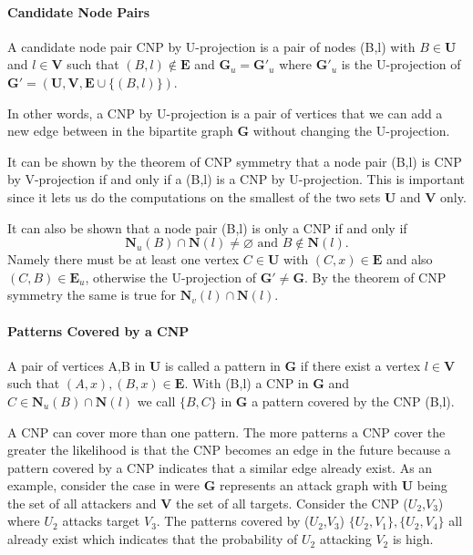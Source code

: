 \paragraph{Candidate Node Pairs}
A candidate node pair CNP by U-projection is a pair of nodes (B,l) with $B\in\textbf{U}$ and $l\in\textbf{V}$ such that $(B,l)\notin\textbf{E}$ and $\textbf{G}_u=\textbf{G}'_u$ where $\textbf{G}'_u$ is the U-projection of $\textbf{G}'=(\textbf{U},\textbf{V},\textbf{E}\cup\{(B,l)\})$.

In other words, a CNP by U-projection is a pair of vertices that we can add a new edge between in the bipartite graph $\textbf{G}$ without changing the U-projection.

It can be shown\cite{plp} by the theorem of CNP symmetry that  a node pair (B,l) is CNP by V-projection if and only if a (B,l) is a CNP by U-projection. This is important since it lets us do the computations on the smallest of the two sets $\textbf{U}$ and $\textbf{V}$ only.

It can also be shown\cite{plp} that a node pair (B,l) is only a CNP if and only if 
$$
\textbf{N}_u(B)\cap\textbf{N}(l) \neq \varnothing\text{ and } B\notin \textbf{N}(l).
$$
Namely there must be at least one vertex $C\in\textbf{U}$ with $(C,x)\in\textbf{E}$ and also $(C,B)\in\textbf{E}_u$, otherwise the U-projection of $\textbf{G}'\neq\textbf{G}$. By the theorem of CNP symmetry the same is true for $\textbf{N}_v(l)\cap\textbf{N}(l)$.

\paragraph{Patterns Covered by a CNP}
A pair of vertices {A,B} in $\textbf{U}$ is called a pattern in $\textbf{G}$ if there exist a vertex $l\in\textbf{V}$ such that $(A,x),(B,x)\in\textbf{E}$. With (B,l) a CNP in $\textbf{G}$ and  $C\in\textbf{N}_u(B)\cap\textbf{N}(l)$ we call $\{B,C\}$ in $\textbf{G}$ a pattern covered by the CNP (B,l).

A CNP can cover more than one pattern. The more patterns a CNP cover the greater the likelihood is that the CNP becomes an edge in the future because a pattern covered by a CNP indicates that a similar edge already exist. As an example, consider the case in  were $\textbf{G}$ represents an attack graph with $\textbf{U}$ being the set of all attackers and $\textbf{V}$ the set of all targets. Consider the CNP ($U_2$,$V_3$) where $U_2$ attacks target $V_3$. The patterns covered by ($U_2$,$V_3$) $\{U_2,V_1\},\{U_2,V_4\}$ all already exist which indicates that the probability of $U_2$ attacking $V_2$ is high.

